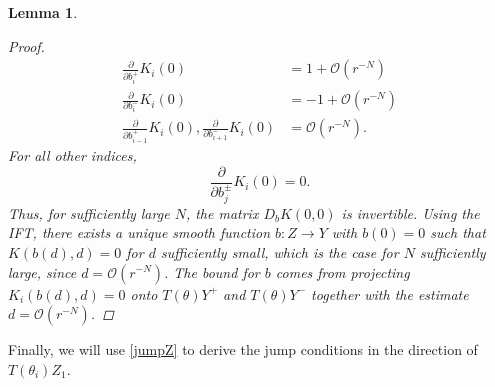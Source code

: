 \documentclass[12pt]{elsarticle}
\newtheorem{lemma}{Lemma}
\begin{document}
\begin{lemma}
\begin{proof}
\begin{align*}
\frac{\partial}{\partial b_i^+}K_i(0) &= 1 + \mathcal{O}(r^{-N})  \\
\frac{\partial}{\partial b_i^-}K_i(0) &= -1 + \mathcal{O}(r^{-N}) \\
\frac{\partial}{\partial b_{i-1}^+}K_i(0),
\frac{\partial}{\partial b_{i+1}^-}K_i(0) &= \mathcal{O}(r^{-N}).
\end{align*}
For all other indices,
\[
\frac{\partial}{\partial b_j^\pm}K_i(0) = 0.
\]
Thus, for sufficiently large $N$, the matrix $D_b K(0,0)$ is invertible. Using the IFT, there exists a unique smooth function $b: Z \rightarrow Y$ with $b(0) = 0$ such that $K(b(d),d) = 0$ for $d$ sufficiently small, which is the case for $N$ sufficiently large, since $d = \mathcal{O}(r^{-N})$. The bound for $b$ comes from projecting $K_i(b(d), d) = 0$ onto $T(\theta)Y^+$ and $T(\theta)Y^-$ together with the estimate $d = \mathcal{O}(r^{-N})$.
\end{proof}
\end{lemma}

Finally, we will use \cref{jumpZ} to derive the jump conditions in the direction of $T(\theta_i) Z_1$.
\end{document}
